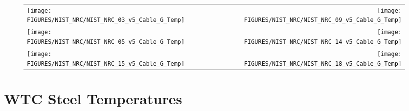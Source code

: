 \clearpage

\begin{figure}[h!]
\begin{tabular*}{\textwidth}{l@{\extracolsep{\fill}}r}
\texttt{[image: FIGURES/NIST\_NRC/NIST\_NRC\_03\_v5\_Cable\_G\_Temp]} &
\texttt{[image: FIGURES/NIST\_NRC/NIST\_NRC\_09\_v5\_Cable\_G\_Temp]} \\
\texttt{[image: FIGURES/NIST\_NRC/NIST\_NRC\_05\_v5\_Cable\_G\_Temp]} &
\texttt{[image: FIGURES/NIST\_NRC/NIST\_NRC\_14\_v5\_Cable\_G\_Temp]} \\
\texttt{[image: FIGURES/NIST\_NRC/NIST\_NRC\_15\_v5\_Cable\_G\_Temp]} &
\texttt{[image: FIGURES/NIST\_NRC/NIST\_NRC\_18\_v5\_Cable\_G\_Temp]}
\end{tabular*}
\label{NIST_NRC_Cable_G_Open}
\end{figure}

\clearpage


\section{WTC Steel Temperatures}


